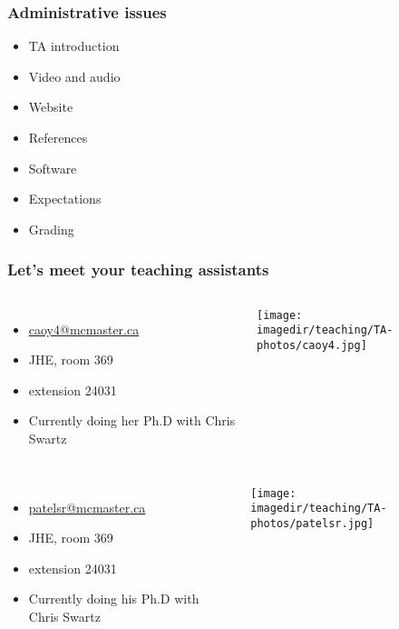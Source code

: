 \begin{frame}\frametitle{Administrative issues}
	\begin{itemize}
		\item	TA introduction
		\item	Video and audio
		\item	Website
		\item	References
		\item	Software
		\item	Expectations
		\item	Grading
	\end{itemize}
\end{frame}

\begin{frame}\frametitle{Let's meet your teaching assistants}
	\vspace{12pt}
	\begin{columns}[t]
			{\color{myGreen}{Yanan Cao}}
			\begin{itemize}
				\item	\url{caoy4@mcmaster.ca}
				\item	JHE, room 369
				\item	extension  24031
				\item	Currently doing her Ph.D with Chris Swartz
			\end{itemize}
			\vspace{-1cm}
			\begin{center}
				\texttt{[image: \\imagedir/teaching/TA-photos/caoy4.jpg]}
			\end{center}
	\end{columns}
		
	
	\vspace{12pt}
	\begin{columns}[t]
			{\color{myGreen}{Shailesh Patel (back on the 17th)}}
			\begin{itemize}
				\item	\url{patelsr@mcmaster.ca}
				\item	JHE, room 369
				\item	extension 24031
				\item	Currently doing his Ph.D with Chris Swartz
			\end{itemize}
			\vspace{-1cm}
			\begin{center}
				\texttt{[image: \\imagedir/teaching/TA-photos/patelsr.jpg]}
			\end{center}
	\end{columns}
	\vspace{24pt}

	{\color{myOrange}{Office hours for both TAs are by email appointment}}
\end{frame}

